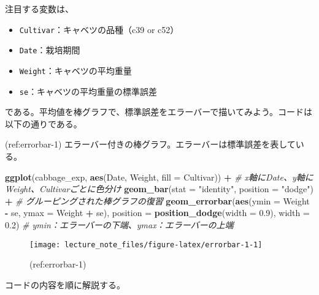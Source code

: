 \documentclass[]{book}
\newenvironment{Shaded}{\begin{snugshade}}{\end{snugshade}}
\newcommand{\KeywordTok}[1]{\textcolor[rgb]{0.13,0.29,0.53}{\textbf{#1}}}
\newcommand{\DataTypeTok}[1]{\textcolor[rgb]{0.13,0.29,0.53}{#1}}
\newcommand{\FloatTok}[1]{\textcolor[rgb]{0.00,0.00,0.81}{#1}}
\newcommand{\StringTok}[1]{\textcolor[rgb]{0.31,0.60,0.02}{#1}}
\newcommand{\CommentTok}[1]{\textcolor[rgb]{0.56,0.35,0.01}{\textit{#1}}}
\newcommand{\OperatorTok}[1]{\textcolor[rgb]{0.81,0.36,0.00}{\textbf{#1}}}
\newcommand{\NormalTok}[1]{#1}
\begin{document}
注目する変数は、

\begin{itemize}
\item
  \texttt{Cultivar}：キャベツの品種（c39 or c52）
\item
  \texttt{Date}：栽培期間
\item
  \texttt{Weight}：キャベツの平均重量
\item
  \texttt{se}：キャベツの平均重量の標準誤差
\end{itemize}

である。平均値を棒グラフで、標準誤差をエラーバーで描いてみよう。コードは以下の通りである。

(ref:errorbar-1)
エラーバー付きの棒グラフ。エラーバーは標準誤差を表している。

\begin{Shaded}
\begin{Highlighting}[]
\KeywordTok{ggplot}\NormalTok{(cabbage_exp, }\KeywordTok{aes}\NormalTok{(Date, Weight, }\DataTypeTok{fill =}\NormalTok{ Cultivar)) }\OperatorTok{+}\StringTok{ }\CommentTok{# x軸にDate、y軸にWeight、Cultivarごとに色分け}
\StringTok{  }\KeywordTok{geom_bar}\NormalTok{(}\DataTypeTok{stat =} \StringTok{"identity"}\NormalTok{, }\DataTypeTok{position =} \StringTok{"dodge"}\NormalTok{) }\OperatorTok{+}\StringTok{ }\CommentTok{# グルーピングされた棒グラフの復習}
\StringTok{  }\KeywordTok{geom_errorbar}\NormalTok{(}\KeywordTok{aes}\NormalTok{(}\DataTypeTok{ymin =}\NormalTok{ Weight }\OperatorTok{-}\StringTok{ }\NormalTok{se, }\DataTypeTok{ymax =}\NormalTok{ Weight }\OperatorTok{+}\StringTok{ }\NormalTok{se), }\DataTypeTok{position =} \KeywordTok{position_dodge}\NormalTok{(}\DataTypeTok{width =} \FloatTok{0.9}\NormalTok{), }\DataTypeTok{width =} \FloatTok{0.2}\NormalTok{) }\CommentTok{# ymin：エラーバーの下端、ymax：エラーバーの上端}
\end{Highlighting}
\end{Shaded}

\begin{figure}

{\centering \texttt{[image: lecture\_note\_files/figure-latex/errorbar-1-1]} 

}

\caption{(ref:errorbar-1)}\label{fig:errorbar-1}
\end{figure}

コードの内容を順に解説する。
\end{document}
